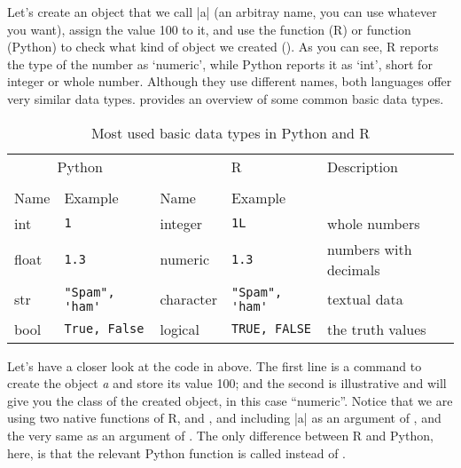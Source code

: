Let's create an object that we call |a| (an arbitray name, you can use
whatever you want), assign the value 100 to it, and use the 
function (R) or  function (Python) to check what kind of
object we created ().
As you can see, R reports the type of the number as `numeric', while Python reports it
as `int', short for integer or whole number.  Although they use
different names, both languages offer very similar data types.
 provides an overview of some common basic data types.


\newcommand{\fndouble}{In R, double and numeric can generally be used
  interchangably (there is a subtle difference, but that is not
  relevant here).}

\begin{table}
  \caption{\label{tab:types}Most used basic data types in Python and R}{
  \begin{tabularx}{\textwidth}{lllll}
    \toprule
    \multicolumn{2}{c}{Python} & \multicolumn{2}{c}{R}& Description \\
    \cmidrule(lr){1-2}    \cmidrule(lr){3-4}\\
    Name & Example & Name & Example \\
    \midrule
    int   & \verb+1+             & integer   & \verb+1L+             & whole numbers \\
    float & \verb+1.3+           & numeric   & \verb+1.3+           & numbers with decimals \\
    str   & \verb+"Spam", 'ham'+ & character & \verb+"Spam", 'ham'+ & textual data  \\ 
    bool  & \verb+True, False+   & logical   & \verb+TRUE, FALSE+   & the truth values \\
    \bottomrule
  \end{tabularx}}{}
\end{table}
    


Let's have a closer look at the code in  above.
The first line is a command to create the object \emph{a} and store
its value 100; and the second is illustrative and will give you the
class of the created object, in this case ``numeric''. Notice that we
are using two native functions of R,  and , and
including |a| as an argument of , and the very same
 as an argument of . The only difference
between R and Python, here, is that the relevant Python function is
called  instead of .


